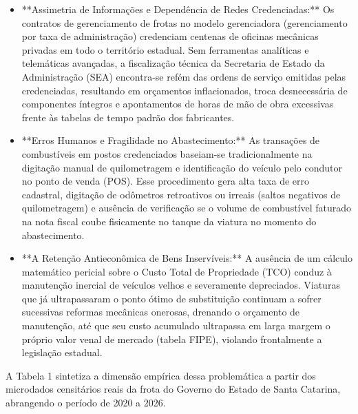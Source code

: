 \documentclass[10pt,a4paper,journal]{article}
\begin{document}
\begin{itemize}
\item **Assimetria de Informações e Dependência de Redes Credenciadas:** Os contratos de gerenciamento de frotas no modelo gerenciadora (gerenciamento por taxa de administração) credenciam centenas de oficinas mecânicas privadas em todo o território estadual. Sem ferramentas analíticas e telemáticas avançadas, a fiscalização técnica da Secretaria de Estado da Administração (SEA) encontra-se refém das ordens de serviço emitidas pelas credenciadas, resultando em orçamentos inflacionados, troca desnecessária de componentes íntegros e apontamentos de horas de mão de obra excessivas frente às tabelas de tempo padrão dos fabricantes.
\end{itemize}
\begin{itemize}
\item **Erros Humanos e Fragilidade no Abastecimento:** As transações de combustíveis em postos credenciados baseiam-se tradicionalmente na digitação manual de quilometragem e identificação do veículo pelo condutor no ponto de venda (POS). Esse procedimento gera alta taxa de erro cadastral, digitação de odômetros retroativos ou irreais (saltos negativos de quilometragem) e ausência de verificação se o volume de combustível faturado na nota fiscal coube fisicamente no tanque da viatura no momento do abastecimento.
\end{itemize}
\begin{itemize}
\item **A Retenção Antieconômica de Bens Inservíveis:** A ausência de um cálculo matemático pericial sobre o Custo Total de Propriedade (TCO) conduz à manutenção inercial de veículos velhos e severamente depreciados. Viaturas que já ultrapassaram o ponto ótimo de substituição continuam a sofrer sucessivas reformas mecânicas onerosas, drenando o orçamento de manutenção, até que seu custo acumulado ultrapassa em larga margem o próprio valor venal de mercado (tabela FIPE), violando frontalmente a legislação estadual.
\end{itemize}
A Tabela 1 sintetiza a dimensão empírica dessa problemática a partir dos microdados censitários reais da frota do Governo do Estado de Santa Catarina, abrangendo o período de 2020 a 2026.
\end{document}
